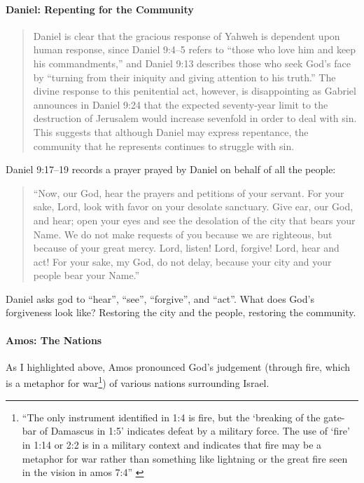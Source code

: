 \paragraph{Daniel: Repenting for the Community}

\begin{quote}
    Daniel is clear that the gracious response of Yahweh is dependent upon human
    response, since Daniel 9:4--5 refers to \enquote{those who love him and keep
    his commandments,} and Daniel 9:13 describes those who seek God's face by
    \enquote{turning from their iniquity and giving attention to his truth.} The
    divine response to this penitential act, however, is disappointing as
    Gabriel announces in Daniel 9:24 that the expected seventy-year limit to the
    destruction of Jerusalem would increase sevenfold in order to deal with sin.
    This suggests that although Daniel may express repentance, the community
    that he represents continues to struggle with sin.
    \autocite[668]{boda:1996}
\end{quote}

Daniel 9:17--19 records a prayer prayed by Daniel on behalf of all the people:

\begin{quote}
    \enquote{Now, our God, hear the prayers and petitions of your servant. For
    your sake, Lord, look with favor on your desolate sanctuary. Give ear, our
    God, and hear; open your eyes and see the desolation of the city that bears
    your Name. We do not make requests of you because we are righteous, but
    because of your great mercy. Lord, listen! Lord, forgive! Lord, hear and
    act! For your sake, my God, do not delay, because your city and your people
    bear your Name.}
\end{quote}

Daniel asks god to \enquote{hear}, \enquote{see}, \enquote{forgive},
and \enquote{act}. What does God's forgiveness look like? Restoring the city and
the people, restoring the community.

\paragraph{Amos: The Nations} As I highlighted above, Amos pronounced God's
judgement (through fire, which is a metaphor for war\footnote{%
\enquote{The only instrument identified in 1:4 is fire, but the
\enquote{breaking of the gate-bar of Damascus in 1:5} indicates defeat by a
military force. The use of \enquote{fire} in 1:14 or 2:2 is in a military
context and indicates that fire may be a metaphor for war rather than
something like lightning or the great fire seen in the vision in amos 7:4}
\autocite[76]{smith:2017}
}) of various nations
surrounding Israel.

